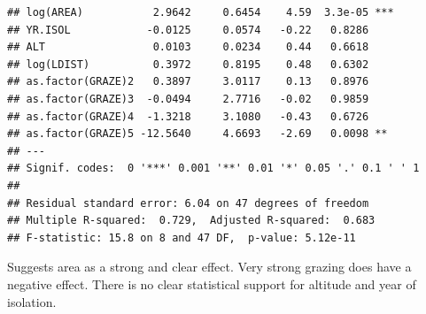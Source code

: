 \documentclass[12pt,a4paper]{scrartcl}\usepackage[]{graphicx}\usepackage[]{color}
\makeatletter
\newenvironment{kframe}{%
 \def\at@end@of@kframe{}%
 \ifinner\ifhmode%
  \def\at@end@of@kframe{\end{minipage}}%
  \begin{minipage}{\columnwidth}%
 \fi\fi%
 \def\FrameCommand##1{\hskip\@totalleftmargin \hskip-\fboxsep
 \colorbox{shadecolor}{##1}\hskip-\fboxsep
     \hskip-\linewidth \hskip-\@totalleftmargin \hskip\columnwidth}%
 \MakeFramed {\advance\hsize-\width
   \@totalleftmargin\z@ \linewidth\hsize
   \@setminipage}}%
 {\par\unskip\endMakeFramed%
 \at@end@of@kframe}
\newenvironment{knitrout}{}{} %
\makeatother
\begin{document}
\begin{Answer}
\begin{knitrout}
\begin{kframe}
\begin{verbatim}
## log(AREA)           2.9642     0.6454    4.59  3.3e-05 ***
## YR.ISOL            -0.0125     0.0574   -0.22   0.8286    
## ALT                 0.0103     0.0234    0.44   0.6618    
## log(LDIST)          0.3972     0.8195    0.48   0.6302    
## as.factor(GRAZE)2   0.3897     3.0117    0.13   0.8976    
## as.factor(GRAZE)3  -0.0494     2.7716   -0.02   0.9859    
## as.factor(GRAZE)4  -1.3218     3.1080   -0.43   0.6726    
## as.factor(GRAZE)5 -12.5640     4.6693   -2.69   0.0098 ** 
## ---
## Signif. codes:  0 '***' 0.001 '**' 0.01 '*' 0.05 '.' 0.1 ' ' 1
## 
## Residual standard error: 6.04 on 47 degrees of freedom
## Multiple R-squared:  0.729,	Adjusted R-squared:  0.683 
## F-statistic: 15.8 on 8 and 47 DF,  p-value: 5.12e-11
\end{verbatim}
\end{kframe}
\end{knitrout}
Suggests area as a strong and clear effect. Very strong grazing does have a negative effect. There is no clear statistical support for altitude and year of isolation.


\end{Answer}
\end{document}
